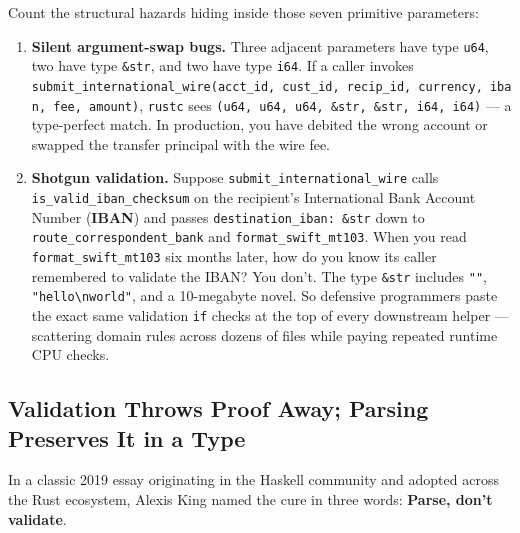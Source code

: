 Count the structural hazards hiding inside those seven primitive parameters:
\begin{enumerate}
  \item \textbf{Silent argument-swap bugs.} Three adjacent parameters have type \texttt{u64}, two have type \texttt{\&str}, and two have type \texttt{i64}. If a caller invokes \texttt{submit\_international\_wire(\allowbreak{}acct\_id,\allowbreak\ cust\_id,\allowbreak\ recip\_id,\allowbreak\ currency,\allowbreak\ iban,\allowbreak\ fee,\allowbreak\ amount)}, \texttt{rustc} sees \texttt{(u64,\allowbreak\ u64,\allowbreak\ u64,\allowbreak\ \&str,\allowbreak\ \&str,\allowbreak\ i64,\allowbreak\ i64)} --- a type-perfect match. In production, you have debited the wrong account or swapped the transfer principal with the wire fee.
  \item \textbf{Shotgun validation.} Suppose \texttt{submit\_\allowbreak{}international\_\allowbreak{}wire} calls \texttt{is\_\allowbreak{}valid\_\allowbreak{}iban\_\allowbreak{}checksum} on the recipient's International Bank Account Number (\textbf{IBAN}) and passes \texttt{destination\_\allowbreak{}iban: \&str} down to \texttt{route\_\allowbreak{}correspondent\_\allowbreak{}bank} and \texttt{format\_\allowbreak{}swift\_\allowbreak{}mt103}. When you read \texttt{format\_\allowbreak{}swift\_\allowbreak{}mt103} six months later, how do you know its caller remembered to validate the IBAN? You don't. The type \texttt{\&str} includes \texttt{""}, \texttt{"hello\textbackslash nworld"}, and a 10-megabyte novel. So defensive programmers paste the exact same validation \texttt{if} checks at the top of every downstream helper --- scattering domain rules across dozens of files while paying repeated runtime CPU checks.
\end{enumerate}

\subsection{Validation Throws Proof Away; Parsing Preserves It in a Type}

In a classic 2019 essay originating in the Haskell community and adopted across the Rust ecosystem, Alexis King named the cure in three words: \textbf{Parse, don't validate}.


